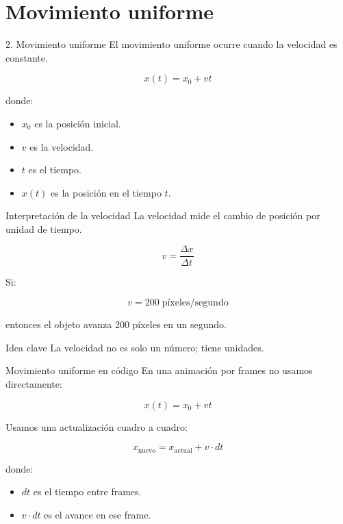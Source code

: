 \documentclass{beamer}
\begin{document}
\section{Movimiento uniforme}

\begin{frame}{2. Movimiento uniforme}
El movimiento uniforme ocurre cuando la velocidad es constante.

\[
x(t)=x_0+vt
\]

donde:

\begin{itemize}
    \item \(x_0\) es la posición inicial.
    \item \(v\) es la velocidad.
    \item \(t\) es el tiempo.
    \item \(x(t)\) es la posición en el tiempo \(t\).
\end{itemize}
\end{frame}

\begin{frame}{Interpretación de la velocidad}
La velocidad mide el cambio de posición por unidad de tiempo.

\[
v=\frac{\Delta x}{\Delta t}
\]

\medskip

Si:

\[
v=200\; \text{píxeles/segundo}
\]

entonces el objeto avanza 200 píxeles en un segundo.

\medskip

\begin{block}{Idea clave}
La velocidad no es solo un número; tiene unidades.
\end{block}
\end{frame}

\begin{frame}{Movimiento uniforme en código}
En una animación por frames no usamos directamente:

\[
x(t)=x_0+vt
\]

\medskip

Usamos una actualización cuadro a cuadro:

\[
x_{\text{nuevo}}=x_{\text{actual}}+v\cdot dt
\]

donde:

\begin{itemize}
    \item \(dt\) es el tiempo entre frames.
    \item \(v\cdot dt\) es el avance en ese frame.
\end{itemize}
\end{frame}
\end{document}
